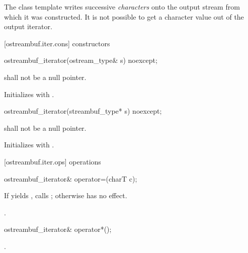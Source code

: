 \pnum
The
class template
writes successive
\textit{characters}
onto the output stream from which it was constructed.
It is not possible to get a character value out of the output iterator.

[ostreambuf.iter.cons]{ constructors}


%
\begin{itemdecl}
ostreambuf_iterator(ostream_type& s) noexcept;
\end{itemdecl}

\begin{itemdescr}
\pnum
\requires
{}
shall not be a null pointer.

\pnum
\effects
Initializes  with .
\end{itemdescr}


%
\begin{itemdecl}
ostreambuf_iterator(streambuf_type* s) noexcept;
\end{itemdecl}

\begin{itemdescr}
\pnum
\requires
{}
shall not be a null pointer.

\pnum
\effects
Initializes  with .
\end{itemdescr}

[ostreambuf.iter.ops]{ operations}

%
\begin{itemdecl}
ostreambuf_iterator& operator=(charT c);
\end{itemdecl}

\begin{itemdescr}
\pnum
\effects
If
yields
,
calls
;
otherwise has no effect.

\pnum
\returns
{}.
\end{itemdescr}

%
\begin{itemdecl}
ostreambuf_iterator& operator*();
\end{itemdecl}

\begin{itemdescr}
\pnum
\returns
{}.
\end{itemdescr}

